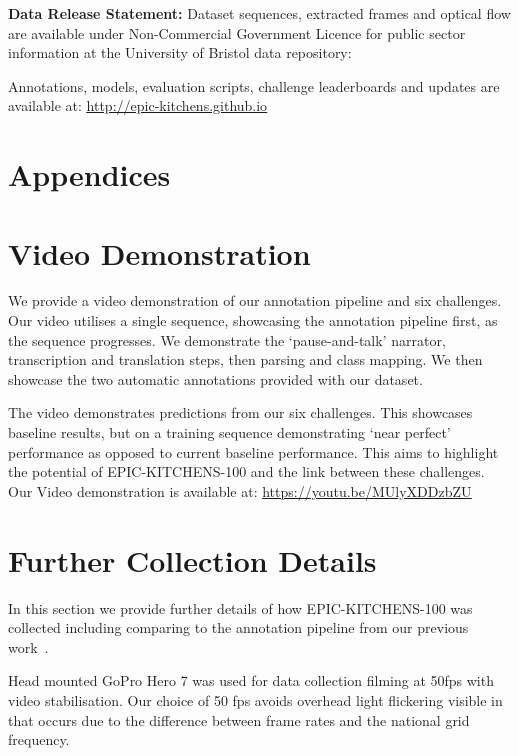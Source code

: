 \documentclass[twocolumn]{svjour3}          \smartqed
\newcommand{\chParagraph}[1]{\noindent {\textbf{#1.}} \hspace{6pt}}
\newcommand {\newDataset} {EPIC-KITCHENS-100}
\begin{document}
\noindent \textbf{Data Release Statement:}
Dataset sequences, extracted frames and optical flow are available under Non-Commercial Government Licence for public sector information at the University of Bristol data repository: \linebreak
{}

\noindent Annotations, models, evaluation scripts, challenge leaderboards and updates are available at: \linebreak 
\textcolor{blue}{\underline{\url{http://epic-kitchens.github.io}}}




\section*{Appendices}
\appendix

\section{Video Demonstration}
We provide a video demonstration of our annotation pipeline and six challenges.
Our video utilises a single sequence, showcasing the annotation pipeline first, as the sequence progresses.
We demonstrate the `pause-and-talk' narrator, transcription and translation steps, then parsing and class mapping.
We then showcase the two automatic annotations provided with our dataset.

The video demonstrates predictions from our six challenges. 
This showcases baseline results, but on a training sequence demonstrating `near perfect' performance as opposed to current baseline performance.
This aims to highlight the potential of \newDataset{} and the link between these challenges. Our Video demonstration is available at: \textcolor{blue}{\underline{\url{https://youtu.be/MUlyXDDzbZU}}}

\section{Further Collection Details}
\label{app:sectionB}

In this section we provide further details of how \newDataset{} was collected including comparing to the annotation pipeline from our previous work~\cite{Damen2018EPICKITCHENS}.

\chParagraph{Camera Settings for Collection}
Head mounted GoPro Hero 7 was used for data collection filming at 50fps with video stabilisation. 
Our choice of 50 fps avoids overhead light flickering visible in~\cite{Damen2018EPICKITCHENS} that occurs due to the difference between frame rates and the national grid frequency.
\end{document}

